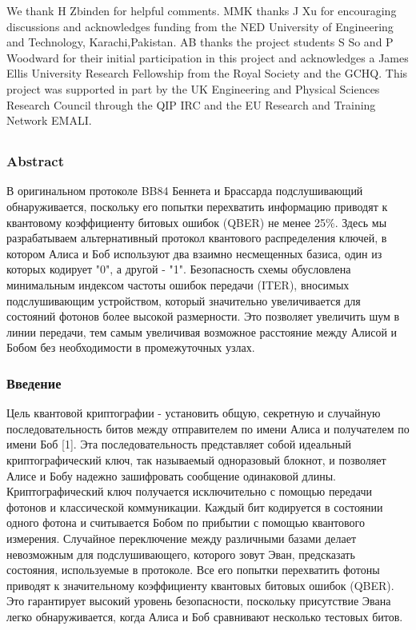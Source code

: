 We thank H Zbinden for helpful comments. MMK thanks J Xu for encouraging discussions and acknowledges funding from the NED University of Engineering and Technology, Karachi,Pakistan. AB thanks the project students S So and P Woodward for their initial participation in this project and acknowledges a James Ellis University Research Fellowship from the Royal Society and the GCHQ. This project was supported in part by the UK Engineering and Physical Sciences Research Council through the QIP IRC and the EU Research and Training Network EMALI.

\subsection{\trnas}
\subsubsection*{Abstract}

В оригинальном протоколе BB84 Беннета и Брассарда подслушивающий обнаруживается, поскольку его попытки перехватить информацию приводят к квантовому коэффициенту битовых ошибок (QBER) не менее 25\%. Здесь мы разрабатываем альтернативный протокол квантового распределения ключей, в котором Алиса и Боб используют два взаимно несмещенных базиса, один из которых кодирует "0", а другой - "1". Безопасность схемы обусловлена минимальным индексом частоты ошибок передачи (ITER), вносимых подслушивающим устройством, который значительно увеличивается для состояний фотонов более высокой размерности. Это позволяет увеличить шум в линии передачи, тем самым увеличивая возможное расстояние между Алисой и Бобом без необходимости в промежуточных узлах.

\subsubsection{Введение}

Цель квантовой криптографии - установить общую, секретную и случайную последовательность битов между отправителем по имени Алиса и получателем по имени Боб [1]. Эта последовательность представляет собой идеальный криптографический ключ, так называемый одноразовый блокнот, и позволяет Алисе и Бобу надежно зашифровать сообщение одинаковой длины. Криптографический ключ получается исключительно с помощью передачи фотонов и классической коммуникации. Каждый бит кодируется в состоянии одного фотона и считывается Бобом по прибытии с помощью квантового измерения. Случайное переключение между различными базами делает невозможным для подслушивающего, которого зовут Эван, предсказать состояния, используемые в протоколе. Все его попытки перехватить фотоны приводят к значительному коэффициенту квантовых битовых ошибок (QBER). Это гарантирует высокий уровень безопасности, поскольку присутствие Эвана легко обнаруживается, когда Алиса и Боб сравнивают несколько тестовых битов.

